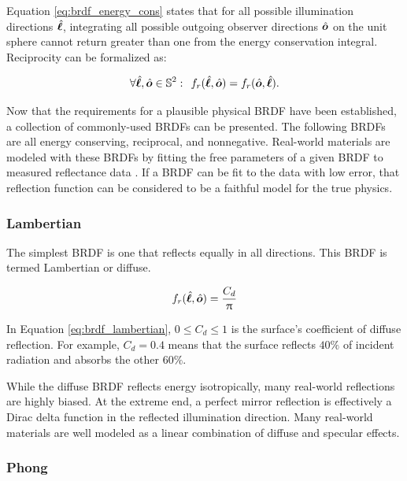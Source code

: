 Equation \ref{eq:brdf_energy_cons} states that for all possible illumination directions $\hat{\bm{\ell}}$, integrating all possible outgoing observer directions $\hat{\bm{o}}$ on the unit sphere cannot return greater than one from the energy conservation integral. Reciprocity can be formalized as:

\begin{equation} \label{eq:brdf_reciprocity}
  \forall \hat{\bm{\ell}}, \hat{\bm{o}} \in \mathbb{S}^2 : \:\: f_r(\hat{\bm{\ell}}, \hat{\bm{o}}) = f_r(\hat{\bm{o}}, \hat{\bm{\ell}}).
\end{equation}

Now that the requirements for a plausible physical BRDF have been established, a collection of commonly-used BRDFs can be presented. The following BRDFs are all energy conserving, reciprocal, and nonnegative. Real-world materials are modeled with these BRDFs by fitting the free parameters of a given BRDF to measured reflectance data \cite{matusik2003}. If a BRDF can be fit to the data with low error, that reflection function can be considered to be a faithful model for the true physics. 

\subsubsection{Lambertian}

The simplest BRDF is one that reflects equally in all directions. This BRDF is termed Lambertian or diffuse.

\begin{equation} \label{eq:brdf_lambertian}
  f_r(\hat{\bm{\ell}}, \hat{\bm{o}}) = \frac{C_d}{\uppi}
\end{equation}

In Equation \ref{eq:brdf_lambertian}, $0 \leq C_d \leq 1$ is the surface's coefficient of diffuse reflection. For example, $C_d = 0.4$ means that the surface reflects $40\%$ of incident radiation and absorbs the other $60\%$. 

While the diffuse BRDF reflects energy isotropically, many real-world reflections are highly biased. At the extreme end, a perfect mirror reflection is effectively a Dirac delta function in the reflected illumination direction. Many real-world materials are well modeled as a linear combination of diffuse and specular effects. 

\subsubsection{Phong}

